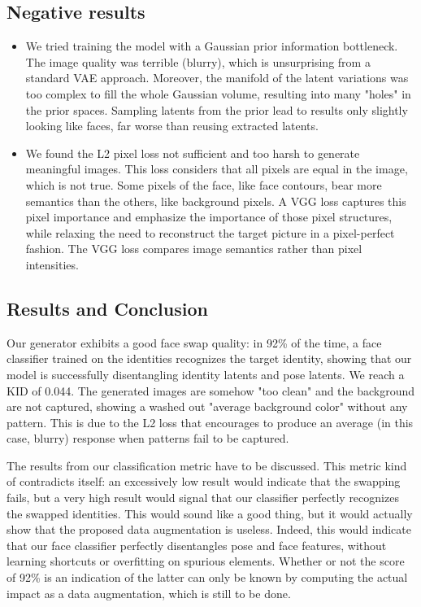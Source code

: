 \subsection{Negative results}

\begin{itemize}
    \item We tried training the model with a Gaussian prior information bottleneck. The image quality was terrible (blurry), which is unsurprising from a standard \ac{VAE} approach. Moreover, the manifold of the latent variations was too complex to fill the whole Gaussian volume, resulting into many "holes" in the prior spaces. Sampling latents from the prior lead to results only slightly looking like faces, far worse than reusing extracted latents.
    
    \item We found the L2 pixel loss not sufficient and too harsh to generate meaningful images. This loss considers that all pixels are equal in the image, which is not true. Some pixels of the face, like face contours, bear more semantics than the others, like background pixels. A VGG loss captures this pixel importance and emphasize the importance of those pixel structures, while relaxing the need to reconstruct the target picture in a pixel-perfect fashion. The VGG loss compares image semantics rather than pixel intensities.
\end{itemize}

\subsection{Results and Conclusion}

Our generator exhibits a good face swap quality: in 92\% of the time, a face classifier trained on the identities recognizes the target identity, showing that our model is successfully disentangling identity latents and pose latents. We reach a KID of 0.044. The generated images are somehow "too clean" and the background are not captured, showing a washed out "average background color" without any pattern. This is due to the L2 loss that encourages to produce an average (in this case, blurry) response when patterns fail to be captured. 

The results from our classification metric have to be discussed. This metric kind of contradicts itself: an excessively low result would indicate that the swapping fails, but a very high result would signal that our classifier perfectly recognizes the swapped identities. This would sound like a good thing, but it would actually show that the proposed data augmentation is useless. Indeed, this would indicate that our face classifier perfectly disentangles pose and face features, without learning shortcuts or overfitting on spurious elements. Whether or not the score of 92\% is an indication of the latter can only be known by computing the actual impact as a data augmentation, which is still to be done.

